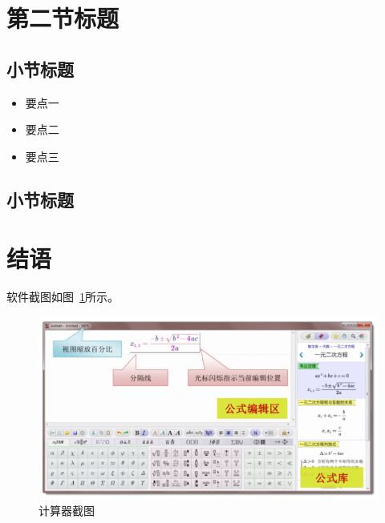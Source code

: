 \documentclass[a4paper,12pt]{report}
\begin{document}
\section{第二节标题}
\begin{spacing}{1.5}
\subsection{小节标题}
\begin{itemize}
  \item 要点一 \cite{GDLIII}
  \item 要点二 \cite{einstein}
  \item 要点三 \cite{knuthwebsite}
\end{itemize}

\subsection{小节标题}

\end{spacing}

\section{结语}
\songti
\begin{spacing}{1.5}
软件截图如图~\ref{pic1}所示。
\begin{figure}[!ht]
  \centering
\includegraphics[width=12cm]{figure/calculator.png}\caption{计算器截图}\label{pic1}
\end{figure}

\end{spacing}





\end{document}
